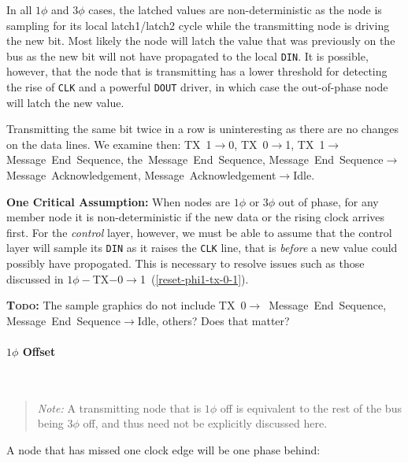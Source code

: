 In all $1\phi$ and $3\phi$ cases, the latched values are non-deterministic as
the node is sampling for its local {\sc latch1/latch2} cycle while the transmitting
node is driving the new bit. Most likely the node will latch the value that
was previously on the bus as the new bit will not have propagated to the local
{\tt DIN}. It is possible, however, that the node that is transmitting has a
lower threshold for detecting the rise of {\tt CLK} and a powerful {\tt DOUT}
driver, in which case the out-of-phase node will latch the new value.

Transmitting the same bit twice in a row is uninteresting as there are no
changes on the data lines. We examine then: TX~1$\rightarrow$0,
TX~0$\rightarrow$1, TX~1$\rightarrow$Message~End~Sequence,
the~Message~End~Sequence,
Message~End~Sequence$\rightarrow$Message~Acknowledgement,
Message~Acknowledgement$\rightarrow$Idle.

\medskip
\noindent
\begin{framed}
  \label{reset-assumption}
  \textbf{One Critical Assumption:} When nodes are $1\phi$ or $3\phi$ out of
  phase, for any member node it is non-deterministic if the new data or the
  rising clock arrives first. For the {\em control} layer, however, we must
  be able to assume that the control layer will sample its {\tt DIN} as it
  raises the {\tt CLK} line, that is {\em before} a new value could possibly
  have propogated.  This is necessary to resolve issues such as those discussed
  in $1\phi-$TX$-0\rightarrow$1~(\ref{reset-phi1-tx-0-1}).
\end{framed}

\medskip
\textbf{\textsc{Todo:}} The sample graphics do not include
TX~0$\rightarrow$~Message~End~Sequence, Message~End~Sequence$\rightarrow$Idle,
others? Does that matter?

\paragraph{$1\phi$ Offset}
~

\begin{quote}
{\em Note:} A transmitting node that is $1\phi$ off is equivalent to the rest
of the bus being $3\phi$ off, and thus need not be explicitly discussed here.
\end{quote}

A node that has missed one clock edge will be one phase behind:

